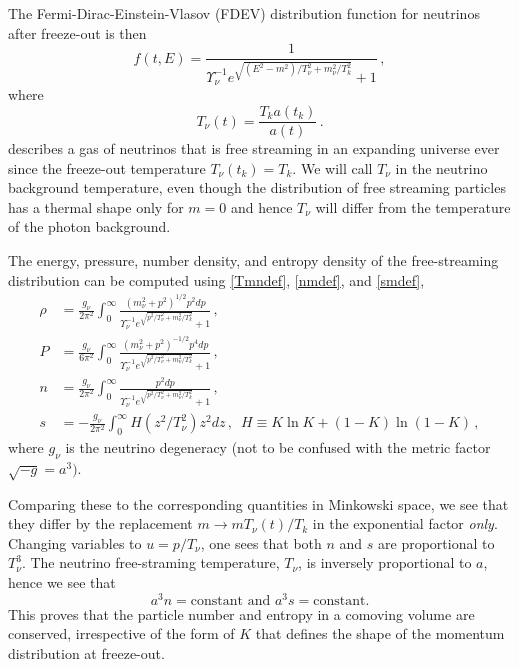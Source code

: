 The Fermi-Dirac-Einstein-Vlasov (FDEV) distribution function for neutrinos after freeze-out is then
\begin{equation}\label{neutrino_dist}
f(t,E)=\frac{1}{\Upsilon_\nu^{-1}e^{\sqrt{(E^2-m^2)/T_\nu^2+m_\nu^2 /T_k^2}}+ 1}\,,
\end{equation}
where 
\begin{equation}\label{Tneutrino_dist}
T_\nu(t)=\frac{T_ka(t_k)}{a(t)}\,.  
\end{equation}
 describes a gas of neutrinos that is free streaming in an expanding universe ever since the freeze-out temperature $T_\nu(t_k)=T_k$. We will call $T_\nu$ in  the neutrino background temperature, even though  the distribution of free streaming particles has a thermal shape only for $m=0$ and hence $T_{\nu}$ will differ from the temperature of the photon background.   

The energy, pressure, number density, and entropy density of the free-streaming distribution can be computed using \eqref{Tmndef}, \eqref{nmdef}, and \eqref{smdef},
\begin{align}
\rho&=\frac{g_\nu}{2\pi^2}\!\int_0^\infty\!\!\!\frac{\left(m_\nu^2+p^2\right)^{1/2}p^2dp }{\Upsilon_\nu^{-1}e^{\sqrt{p^2/T_\nu^2+m_\nu^2/T_k^2}}+ 1}\,,\label{neutrino_rho}\\[0.2cm]
P&=\frac{g_\nu}{6\pi^2}\!\int_0^\infty\!\!\!\frac{\left(m_\nu^2+p^2\right)^{-1/2}p^4dp }{\Upsilon_\nu^{-1} e^{\sqrt{p^2/T_\nu^2+m_\nu^2/T_k^2}}+ 1}\,,\label{neutrino_P}\\[0.2cm]
n&=\frac{g_\nu}{2\pi^2}\!\int_0^\infty\!\!\!\frac{p^2dp }{\Upsilon_\nu^{-1}e^{\sqrt{p^2/T_\nu^2+m_\nu^2/T_k^2}}+ 1}\,,\label{num_density}\\
s&=-\frac{g_\nu}{2\pi^2}\!\int_0^\infty\!\!\!H(z^2/T_\nu^2)z^2dz\,,\,\,\,H\equiv K\ln K +(1-K)\ln(1-K)\,,\label{entropy_integrand}
\end{align}
where $g_\nu$ is the neutrino degeneracy (not to be confused with the metric factor $\sqrt{-g}=a^3)$.

Comparing these to the corresponding quantities in Minkowski space, we see that they differ by the replacement $m\rightarrow m T_\nu(t)/T_k$ in the exponential factor  {\em only}.  Changing variables to $u=p/T_\nu$, one sees that both $n$ and $s$ are proportional to $T_\nu^3$.  The neutrino free-straming temperature, $T_\nu$, is inversely proportional to $a$, hence we see that
\begin{equation}\label{const_entropy}
a^3n=\text{constant}\text{ and } a^3s=\text{constant}.
\end{equation}
This proves that the particle number and entropy in a comoving volume are conserved, irrespective of the  form of $K$ that defines the shape of the momentum distribution at freeze-out. 


